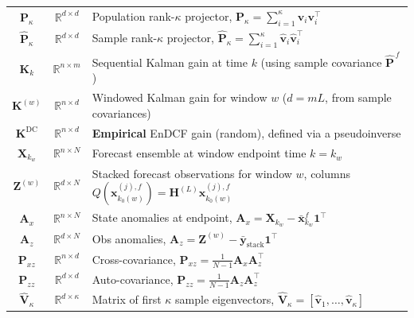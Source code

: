 \documentclass[11pt,a4paper]{article}
\begin{document}
\begin{table}[H]
{\begin{tabular}{ccl}
$\mathbf{P}_\kappa$ & $\mathbb{R}^{d\times d}$ & Population rank-$\kappa$ projector, $\mathbf{P}_\kappa=\sum_{i=1}^\kappa \mathbf{v}_i\mathbf{v}_i^\top$ \\
$\hat{\mathbf{P}}_\kappa$ & $\mathbb{R}^{d\times d}$ & Sample rank-$\kappa$ projector, $\hat{\mathbf{P}}_\kappa=\sum_{i=1}^\kappa \hat{\mathbf{v}}_i\hat{\mathbf{v}}_i^\top$ \\
$\mathbf{K}_k$ & $\mathbb{R}^{n\times m}$ & Sequential Kalman gain at time $k$ (using sample covariance $\widehat{\mathbf{P}}^{\,f}$) \\
$\mathbf{K}^{(w)}$ & $\mathbb{R}^{n\times d}$ & Windowed Kalman gain for window $w$ ($d=mL$, from sample covariances) \\
$\mathbf{K}^{\mathrm{DC}}$ & $\mathbb{R}^{n\times d}$ & \textbf{Empirical} EnDCF gain (random), defined via a pseudoinverse \\
$\mathbf{X}_{k_w}$ & $\mathbb{R}^{n\times N}$ & Forecast ensemble at window endpoint time $k=k_w$ \\
$\mathbf{Z}^{(w)}$ & $\mathbb{R}^{d\times N}$ & Stacked forecast observations for window $w$, columns $Q(\mathbf{x}_{k_0(w)}^{(j),f})=\mathbf{H}^{(L)}\mathbf{x}_{k_0(w)}^{(j),f}$ \\
$\mathbf{A}_x$ & $\mathbb{R}^{n\times N}$ & State anomalies at endpoint, $\mathbf{A}_x=\mathbf{X}_{k_w}-\bar{\mathbf{x}}_{k_w}^f\mathbf{1}^\top$ \\
$\mathbf{A}_z$ & $\mathbb{R}^{d\times N}$ & Obs anomalies, $\mathbf{A}_z=\mathbf{Z}^{(w)}-\bar{\mathbf{y}}_{\mathrm{stack}}\mathbf{1}^\top$ \\
$\mathbf{P}_{xz}$ & $\mathbb{R}^{n\times d}$ & Cross-covariance, $\mathbf{P}_{xz}=\frac{1}{N-1}\mathbf{A}_x\mathbf{A}_z^\top$ \\
$\mathbf{P}_{zz}$ & $\mathbb{R}^{d\times d}$ & Auto-covariance, $\mathbf{P}_{zz}=\frac{1}{N-1}\mathbf{A}_z\mathbf{A}_z^\top$ \\
$\hat{\mathbf{V}}_\kappa$ & $\mathbb{R}^{d\times \kappa}$ & Matrix of first $\kappa$ sample eigenvectors, $\hat{\mathbf{V}}_\kappa=[\hat{\mathbf{v}}_1,\ldots,\hat{\mathbf{v}}_\kappa]$ \\
\bottomrule
\end{tabular}%
}
\end{table}


\end{document}
